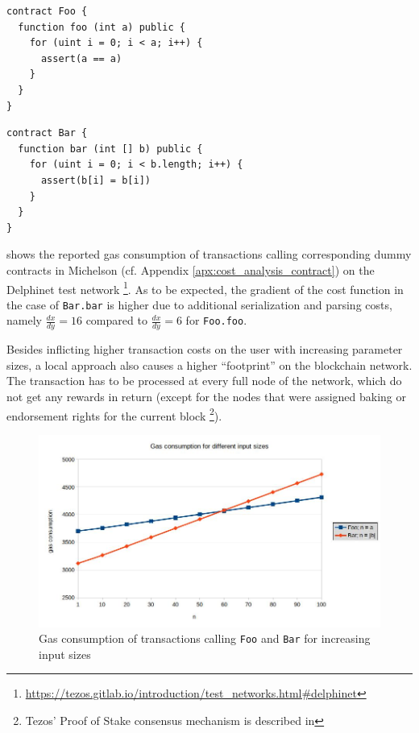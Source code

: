\begin{lstlisting}[numbers=none, language=Solidity, caption=Simple dummy contract executing a loop]
contract Foo {
  function foo (int a) public {
    for (uint i = 0; i < a; i++) {
      assert(a == a)
    }
  }
}
\end{lstlisting}
\begin{lstlisting}[numbers=none, language=Solidity, caption=Simple dummy contract iterating over a list]
contract Bar {
  function bar (int [] b) public {
    for (uint i = 0; i < b.length; i++) {
      assert(b[i] = b[i])
    }
  }
}
\end{lstlisting}

 shows the reported gas consumption of transactions calling corresponding dummy contracts in Michelson (cf. Appendix \ref{apx:cost_analysis_contract}) on the Delphinet test network \footnote{\url{https://tezos.gitlab.io/introduction/test_networks.html\#delphinet}}. As to be expected, the gradient of the cost function in the case of \texttt{Bar.bar} is higher due to additional serialization and parsing costs, namely $\frac{dx}{dy} = 16$ compared to $\frac{dx}{dy} = 6$ for \texttt{Foo.foo}.


Besides inflicting higher transaction costs on the user with increasing parameter sizes, a local approach also causes a higher ``footprint'' on the blockchain network. The transaction has to be processed at every full node of the network, which do not get any rewards in return (except for the nodes that were assigned baking or endorsement rights for the current block \footnote{Tezos' Proof of Stake consensus mechanism is described in }).

\begin{figure}[p]
\centering
\includegraphics[width=0.9\linewidth]{figures/2-use_cases/cost_analysis}
\caption{Gas consumption of transactions calling \texttt{Foo} and \texttt{Bar} for increasing input sizes}
\label{fig:use_case_cost}
\vspace{128in}
\end{figure}
